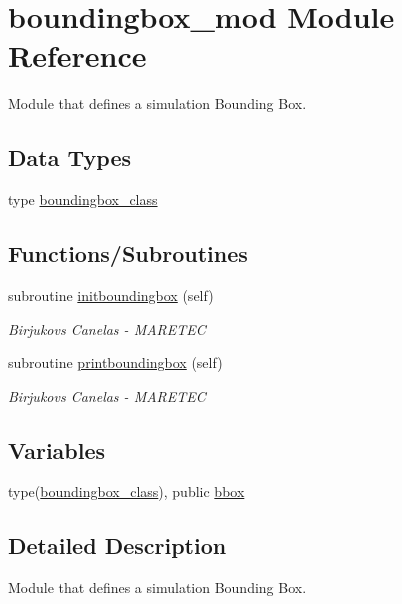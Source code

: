 \hypertarget{namespaceboundingbox__mod}{}\section{boundingbox\+\_\+mod Module Reference}
\label{namespaceboundingbox__mod}


Module that defines a simulation Bounding Box.  


\subsection*{Data Types}
\begin{DoxyCompactItemize}
\item 
type \hyperlink{structboundingbox__mod_1_1boundingbox__class}{boundingbox\+\_\+class}
\end{DoxyCompactItemize}
\subsection*{Functions/\+Subroutines}
\begin{DoxyCompactItemize}
\item 
subroutine \hyperlink{namespaceboundingbox__mod_a35e41bb92c19802441dd8d748c3acfb4}{initboundingbox} (self)
\begin{DoxyCompactList}\small\item\em Birjukovs Canelas -\/ M\+A\+R\+E\+T\+EC \end{DoxyCompactList}\item 
subroutine \hyperlink{namespaceboundingbox__mod_a6ec461b758bc180dc72b5fb23169feca}{printboundingbox} (self)
\begin{DoxyCompactList}\small\item\em Birjukovs Canelas -\/ M\+A\+R\+E\+T\+EC \end{DoxyCompactList}\end{DoxyCompactItemize}
\subsection*{Variables}
\begin{DoxyCompactItemize}
\item 
type(\hyperlink{structboundingbox__mod_1_1boundingbox__class}{boundingbox\+\_\+class}), public \hyperlink{namespaceboundingbox__mod_a45e98e492bb546328c98f618a74622ec}{bbox}
\end{DoxyCompactItemize}


\subsection{Detailed Description}
Module that defines a simulation Bounding Box. 

